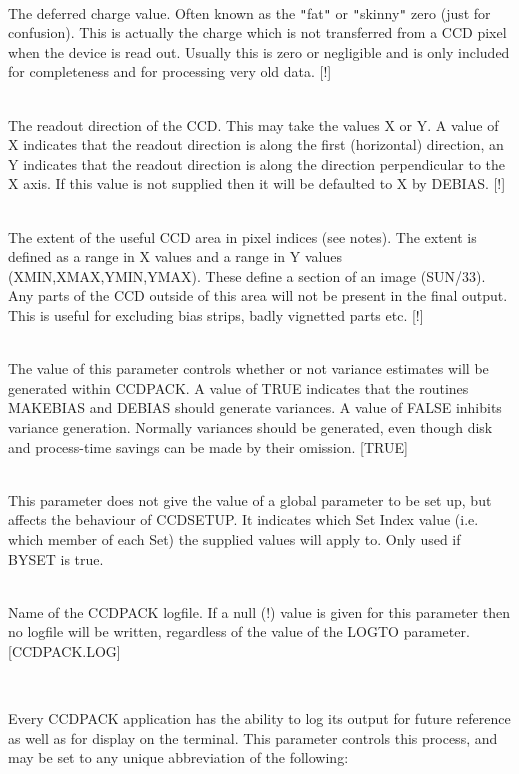 \documentclass[twoside,11pt]{article}
\newcommand{\htmlref}[2]{#1}
\newcommand{\xlabel}[1]{}
\renewcommand{\_}{\texttt{\symbol{95}}}
\newcommand{\qt}[1]{{\tt "}#1{\tt "}}
\newcommand{\xroutine}[1]{\htmlref{{\sc #1}}{#1}}
\newcommand{\sstsubsection}[1]{ \item[{#1}] \mbox{} \\}
\newcommand{\sstitemlist}[1]{
  \mbox{} \\
  \vspace{-3.5ex}
  \begin{itemize}
     #1
  \end{itemize}
}
\newcommand{\sstsubsection}[1]{\item[{#1}]}
\newcommand{\sstitemlist}[1]{
      \begin{itemize}
         #1
      \end{itemize}
      \\
   }
\begin{document}
{{{      }
      \sstsubsection{
         \xlabel{CCDdeferred}
         DEFERRED = \_DOUBLE (Read and Write)
      } {
         The deferred charge value. Often known as the \qt{fat} or \qt{skinny}
         zero (just for confusion). This is actually the charge which is
         not transferred from a CCD pixel when the device is read out.
         Usually this is zero or negligible and is only included for
         completeness and for processing very old data.
         [!]
      }
      \sstsubsection{
         \xlabel{CCDdirection}
         DIRECTION = LITERAL (Read and Write)
      } {
         The readout direction of the CCD. This may take the values X
         or Y.  A value of X indicates that the readout direction is
         along the first (horizontal) direction, an Y indicates that
         the readout direction is along the direction perpendicular to
         the X axis. If this value is not supplied then it will be
         defaulted to X by \xroutine{DEBIAS}.
         [!]
      }
      \sstsubsection{
         \xlabel{CCDextent}
         EXTENT( 4 ) = \_INTEGER (Read and Write)
      } {
         The extent of the useful CCD area in pixel indices (see notes).
         The extent is defined as a range in X values and a range in Y
         values (XMIN,XMAX,YMIN,YMAX). These define a section of an image
         (SUN/33). Any parts of the CCD outside of this area will not
         be present in the final output. This is useful for excluding
         bias strips, badly vignetted parts etc.
         [!]
      }
      \sstsubsection{
         GENVAR = \_LOGICAL (Read and Write)
      } {
         The value of this parameter controls whether or not variance
         estimates will be generated within CCDPACK. A value of TRUE
         indicates that the routines \xroutine{MAKEBIAS} and \xroutine{DEBIAS} should generate
         variances. A value of FALSE inhibits variance generation.
         Normally variances should be generated, even though disk and
         process-time savings can be made by their omission.
         [TRUE]
      }
      \sstsubsection{
         INDEX = \_INTEGER (Read)
      } {
         This parameter does not give the value of a global parameter
         to be set up, but affects the behaviour of CCDSETUP.
         It indicates which Set Index value (i.e. which member of each
         Set) the supplied values will apply to.  Only used if BYSET
         is true.
      }
      \sstsubsection{
         LOGFILE = FILENAME (Read and Write)
      } {
         Name of the CCDPACK logfile.  If a null (!) value is given for
         this parameter then no logfile will be written, regardless of
         the value of the LOGTO parameter.
         [CCDPACK.LOG]
      }
      \sstsubsection{
         LOGTO = LITERAL (Read and Write)
      } {
         Every CCDPACK application has the ability to log its output
         for future reference as well as for display on the terminal.
         This parameter controls this process, and may be set to any
         unique abbreviation of the following:
         \sstitemlist{

}}}}
\end{document}
